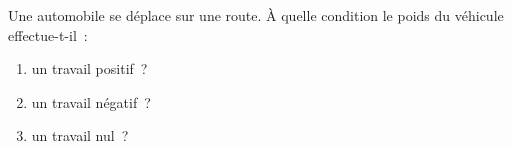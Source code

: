 Une automobile se déplace sur une route. À quelle condition le poids du véhicule
effectue-t-il~:
\begin{enumerate}
    \item un travail positif~?
    \item un travail négatif~?
    \item un travail nul~?
\end{enumerate}

